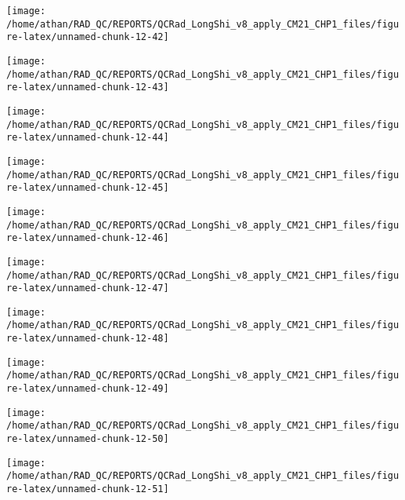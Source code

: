 \documentclass[
  10pt,
  a4paper,oneside]{article}
\begin{document}
\begin{center}\texttt{[image: /home/athan/RAD\_QC/REPORTS/QCRad\_LongShi\_v8\_apply\_CM21\_CHP1\_files/figure-latex/unnamed-chunk-12-42]} \end{center}

\begin{center}\texttt{[image: /home/athan/RAD\_QC/REPORTS/QCRad\_LongShi\_v8\_apply\_CM21\_CHP1\_files/figure-latex/unnamed-chunk-12-43]} \end{center}

\begin{center}\texttt{[image: /home/athan/RAD\_QC/REPORTS/QCRad\_LongShi\_v8\_apply\_CM21\_CHP1\_files/figure-latex/unnamed-chunk-12-44]} \end{center}

\begin{center}\texttt{[image: /home/athan/RAD\_QC/REPORTS/QCRad\_LongShi\_v8\_apply\_CM21\_CHP1\_files/figure-latex/unnamed-chunk-12-45]} \end{center}

\begin{center}\texttt{[image: /home/athan/RAD\_QC/REPORTS/QCRad\_LongShi\_v8\_apply\_CM21\_CHP1\_files/figure-latex/unnamed-chunk-12-46]} \end{center}

\begin{center}\texttt{[image: /home/athan/RAD\_QC/REPORTS/QCRad\_LongShi\_v8\_apply\_CM21\_CHP1\_files/figure-latex/unnamed-chunk-12-47]} \end{center}

\begin{center}\texttt{[image: /home/athan/RAD\_QC/REPORTS/QCRad\_LongShi\_v8\_apply\_CM21\_CHP1\_files/figure-latex/unnamed-chunk-12-48]} \end{center}

\begin{center}\texttt{[image: /home/athan/RAD\_QC/REPORTS/QCRad\_LongShi\_v8\_apply\_CM21\_CHP1\_files/figure-latex/unnamed-chunk-12-49]} \end{center}

\begin{center}\texttt{[image: /home/athan/RAD\_QC/REPORTS/QCRad\_LongShi\_v8\_apply\_CM21\_CHP1\_files/figure-latex/unnamed-chunk-12-50]} \end{center}

\begin{center}\texttt{[image: /home/athan/RAD\_QC/REPORTS/QCRad\_LongShi\_v8\_apply\_CM21\_CHP1\_files/figure-latex/unnamed-chunk-12-51]} \end{center}
\end{document}
